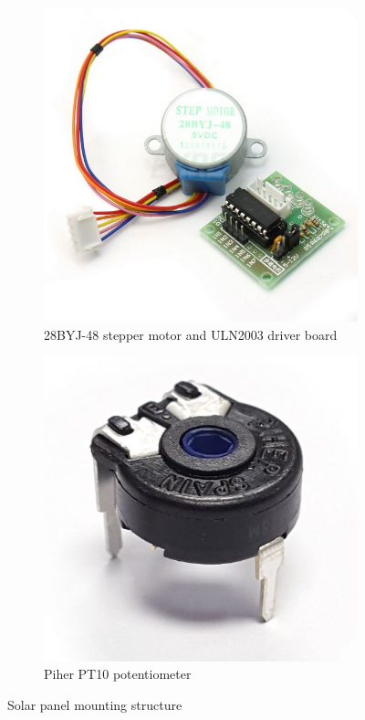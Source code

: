 \begin{figure}[H]
    \centering
    \begin{subfigure}[b]{0.3\textwidth}
       \includegraphics[width=\textwidth]{figures/steppermotor_board.jpg}
       \caption{28BYJ-48 stepper motor and ULN2003 driver board}
    \end{subfigure}
    \begin{subfigure}[b]{0.3\textwidth}
       \includegraphics[width=\textwidth]{figures/pot.JPG}
       \caption{Piher PT10 potentiometer}
    \end{subfigure}
    \caption{Solar panel mounting structure}
    \label{fig:components_rotation}
\end{figure}{}


